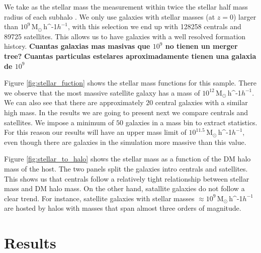 \documentclass[a4paper,fleqn,usenatbib]{mnras}
\newcommand{\Msunh}{\,{\rm M}$_{\odot}$\,\ifmmode h^{-1}\else $h^{-1}$\fi}
\begin{document}
We take as the stellar mass the measurement within
twice the stellar half mass radius of each subhalo
\citep{2018MNRAS.475..676S}.
We only use galaxies with stellar masses (at $z=0$) larger than
$10^{9}$\Msunh,  
with this selection we end up with 128258 centrals and 89725
satellites.
This allows us to have galaxies with a well resolved formation
history. 
\textbf{Cuantas galaxias mas masivas que $10^9$ no tienen un merger
  tree?} 
\textbf{Cuantas particulas estelares aproximadamente tienen una
  galaxia de $10^9$ }




Figure \ref{fig:stellar_fuction} shows the stellar mass functions for
this sample.
There we observe that the most massive satellite galaxy has a
mass of $10^{12}$\Msunh.  
We can also see that there are approximately $20$ central galaxies
with a similar high mass. 
In the results we are going to present next we compare centrals and
satellites. 
We impose a  minimum of $50$ galaxies in a mass bin to extract statistics. 
For this reason our results will have an upper mass limit of
$10^{11.5}$\Msunh, even though there are galaxies in the simulation
more massive than this value.

Figure \ref{fig:stellar_to_halo} shows the stellar mass as a function
of the DM halo mass of the host.
The two panels split the galaxies intro centrals and satellites. 
This shows us that centrals follow a relatively tight relationship
between stellar mass and DM halo mass.
On the other hand, satallite galaxies do not follow a clear trend.
For instance, satellite galaxies with stellar masses $\approx
10^{9}$\Msunh are hosted by halos with masses that span almost three
orders of magnitude.





\section{Results}
\label{sec:galactic_prop}
\end{document}
